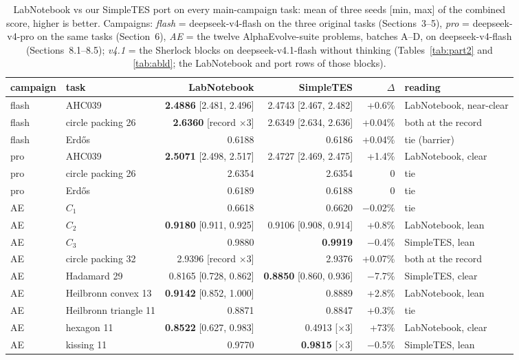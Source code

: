 \begin{table}[H]\centering\small
\caption{LabNotebook vs our SimpleTES port on every main-campaign task: mean of three seeds
[min, max] of the combined score, higher is better. Campaigns: \emph{flash} = deepseek-v4-flash on the
three original tasks (Sections~3--5), \emph{pro} = deepseek-v4-pro on the same tasks (Section~6),
\emph{AE} = the twelve AlphaEvolve-suite problems, batches A--D, on deepseek-v4-flash
(Sections~8.1--8.5); \emph{v4.1} = the Sherlock blocks on deepseek-v4.1-flash without thinking
(Tables~\ref{tab:part2} and \ref{tab:abld}; the LabNotebook and port rows of those blocks).}
\label{tab:h2h}
\begin{tabular}{@{}llrrrl@{}}
\toprule
campaign & task & LabNotebook & SimpleTES & $\Delta$ & reading \\
\midrule
flash & AHC039 & \textbf{2.4886} [2.481, 2.496] & 2.4743 [2.467, 2.482] & +0.6\% & LabNotebook, near-clear \\
flash & circle packing 26 & \textbf{2.6360} [record $\times$3] & 2.6349 [2.634, 2.636] & +0.04\% & both at the record \\
flash & Erd\H{o}s & 0.6188 & 0.6186 & +0.04\% & tie (barrier) \\
pro & AHC039 & \textbf{2.5071} [2.498, 2.517] & 2.4727 [2.469, 2.475] & +1.4\% & LabNotebook, clear \\
pro & circle packing 26 & 2.6354 & 2.6354 & 0 & tie \\
pro & Erd\H{o}s & 0.6189 & 0.6188 & 0 & tie \\
AE & $C_1$ & 0.6618 & 0.6620 & $-$0.02\% & tie \\
AE & $C_2$ & \textbf{0.9180} [0.911, 0.925] & 0.9106 [0.908, 0.914] & +0.8\% & LabNotebook, lean \\
AE & $C_3$ & 0.9880 & \textbf{0.9919} & $-$0.4\% & SimpleTES, lean \\
AE & circle packing 32 & 2.9396 [record $\times$3] & 2.9376 & +0.07\% & both at the record \\
AE & Hadamard 29 & 0.8165 [0.728, 0.862] & \textbf{0.8850} [0.860, 0.936] & $-$7.7\% & SimpleTES, clear \\
AE & Heilbronn convex 13 & \textbf{0.9142} [0.852, 1.000] & 0.8889 & +2.8\% & LabNotebook, lean \\
AE & Heilbronn triangle 11 & 0.8871 & 0.8847 & +0.3\% & tie \\
AE & hexagon 11 & \textbf{0.8522} [0.627, 0.983] & 0.4913 [$\times$3] & +73\% & LabNotebook, clear \\
AE & kissing 11 & 0.9770 & \textbf{0.9815} [$\times$3] & $-$0.5\% & SimpleTES, lean \\

\end{tabular}
\end{table}
